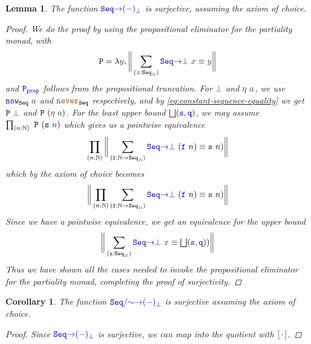 \documentclass[twoside,11pt,openright]{report}
\theoremstyle{plain} %
\newtheorem{lem}[thm]{Lemma}
\newtheorem{cor}{Corollary}
\theoremstyle{definition}
\theoremstyle{remark}
\newcommand*{\term}[1]{\textcolor{green!30!black}{#1}} %
\newcommand*{\type}[1]{\textcolor{magenta!90!black}{#1}}
\newcommand*{\constant}[1]{\textcolor{orange!60!black}{\ensuremath{\mathtt{#1}}}}
\newcommand*{\function}[1]{\textcolor{blue!60!black}{\ensuremath{\mathtt{#1}}}}
\newcommand*{\constructor}[1]{\textcolor{purple!60!black}{\ensuremath{\mathtt{#1}}}}
\newcommand*{\typeformer}[1]{\ensuremath{\mathtt{#1}}}
\newcommand*{\quotientconstructor}[1]{\constructor{[}\,#1\,\constructor{]}}
\begin{document}
\begin{lem}
  The function \(\function{Seq{\rightarrow}(-)_{\bot}}\) is surjective, assuming the axiom of choice.
  \begin{proof}
    We do the proof by using the propositional eliminator for the partiality monad, with
    \begin{equation}
      \typeformer{P} = \lambda \term{y}, \bigg\| \sum_{(\term{x} : \typeformer{Seq}_{\type{R}})} \function{Seq{\rightarrow}\bot}~\term{x} \equiv \term{y} \bigg\|
    \end{equation}
    and \(\function{P_{prop}}\) follows from the propositional truncation. For \(\constructor{\bot}\) and \(\constructor{\eta}~\term{a}\), we use \(\function{now}_{\typeformer{Seq}}~\term{a}\) and \(\constant{never}_{\typeformer{Seq}}\) respectively, and by \eqref{eq:constant-sequence-equality} we get \(\typeformer{P}~\constructor{\bot}\) and \(\typeformer{P}~(\constructor{\eta}~\term{a})\). For the least upper bound \(\constructor{\bigsqcup} (\function{s},\function{q})\), we may assume \(\prod_{(n : \mathbb{N})}~\typeformer{P}~(\function{s}~n)\) which gives us a pointwise equivalence
    \begin{equation}
    \prod_{(n : \mathbb{N})} \bigg\| \sum_{(\function{f} : \mathbb{N} \rightarrow \typeformer{Seq}_{\type{R}})} \function{Seq{\rightarrow}{\bot}}~(\function{f}~n) \equiv \function{s}~n) \bigg\|
  \end{equation}
  which by the axiom of choice becomes
  \begin{equation}
    \bigg\| \prod_{(n : \mathbb{N})} \sum_{(\function{f} : \mathbb{N} \rightarrow \typeformer{Seq}_{\type{R}})} \function{Seq{\rightarrow}{\bot}}~(\function{f}~n) \equiv \function{s}~n) \bigg\|
  \end{equation}
  Since we have a pointwise equivalence, we get an equivalence for the upper bound 
  \begin{equation}
    \bigg\| \sum_{(\function{x} : \typeformer{Seq}_{\type{R}})} \function{Seq{\rightarrow}{\bot}}~\term{x} \equiv {\textstyle{\bigsqcup}}(\function{s},\function{q})) \bigg\|
  \end{equation}
  Thus we have shown all the cases needed to invoke the propositional eliminator for the partiality monad, completing the proof of surjectivity.
  \end{proof}
\end{lem}
\begin{cor}
  \label{cor:sequence-partiality-monad-surjective}
  The function \(\function{Seq/{\sim}{\rightarrow}(-)_{\bot}}\) is surjective assuming the axiom of choice.
  \begin{proof}
    Since \(\function{Seq{\rightarrow}(-)_{\bot}}\) is surjective, we can map into the quotient with \(\quotientconstructor{{\cdot}}\).
  \end{proof}
\end{cor}
\end{document}
